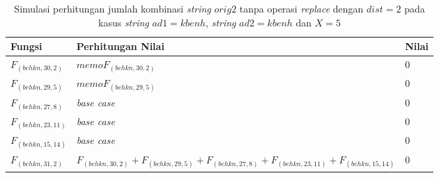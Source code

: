 \begin{appendices}
  \begin{table}[H]
  	\centering
  	\begin{tabular} {|p{3cm}|p{5cm}|p{1cm}|} \hline
  		Fungsi & Perhitungan Nilai & Nilai \\ \hline
  		$ F_{(behkn, 30, 2)}  $ & $memoF_{(behkn, 30, 2)}$ & $ 0 $ \\ \hline
  		$ F_{(behkn, 29, 5)}  $ & $memoF_{(behkn, 29, 5)}$ & $ 0 $ \\ \hline
  		$ F_{(behkn, 27, 8)} $ & \textit{base case} & $ 0 $ \\ \hline
  		$ F_{(behkn, 23, 11)} $ & \textit{base case} & $ 0 $ \\ \hline
  		$ F_{(behkn, 15, 14)} $ & \textit{base case} & $ 0 $ \\ \hline
  		\rowcolor{LightCyan}
  		$ F_{(behkn, 31, 2)}  $ & $F_{(behkn, 30, 2)} + F_{(behkn, 29, 5)} + F_{(behkn, 27, 8)} + F_{(behkn, 23, 11)} + F_{(behkn, 15, 14)}$ & $ 0 $ \\ \hline
  	\end{tabular}\caption{Simulasi perhitungan jumlah kombinasi \textit{string} $ orig2 $ tanpa operasi \textit{replace} dengan $ dist= 2  $ pada kasus \textit{string} $ ad1=kbenh $, \textit{string} $ ad2=kbenh $ dan $ X=5 $}
  	\label{tab:f_3_orig2_2_1}
  \end{table}
  
  

\end{appendices}
